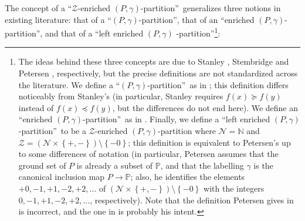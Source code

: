 \documentclass[numbers=enddot,12pt,final,onecolumn,notitlepage]{scrartcl}%
\theoremstyle{definition}
\begin{document}
The concept of a \textquotedblleft$\mathcal{Z}$-enriched $\left(
P,\gamma\right)  $-partition\textquotedblright\ generalizes three notions in
existing literature: that of a \textquotedblleft$\left(  P,\gamma\right)
$-partition\textquotedblright, that of an \textquotedblleft enriched $\left(
P,\gamma\right)  $-partition\textquotedblright, and that of a
\textquotedblleft left enriched $\left(  P,\gamma\right)  $%
-partition\textquotedblright\footnote{The ideas behind these three concepts
are due to Stanley \cite{Stanle72}, Stembridge \cite[\S 2]{Stembr97} and
Petersen \cite{Peters05}, respectively, but the precise definitions are not
standardized across the literature. We define a \textquotedblleft$\left(
P,\gamma\right)  $-partition\textquotedblright\ as in \cite[\S 1.1]{Stembr97};
this definition differs noticeably from Stanley's (in particular, Stanley
requires $f\left(  x\right)  \succcurlyeq f\left(  y\right)  $ instead of
$f\left(  x\right)  \preccurlyeq f\left(  y\right)  $, but the differences do
not end here). We define an \textquotedblleft enriched $\left(  P,\gamma
\right)  $-partition\textquotedblright\ as in \cite[\S 2]{Stembr97}. Finally,
we define a \textquotedblleft left enriched $\left(  P,\gamma\right)
$-partition\textquotedblright\ to be a $\mathcal{Z}$-enriched $\left(
P,\gamma\right)  $-partition where $\mathcal{N}=\mathbb{N}$ and $\mathcal{Z}%
=\left(  \mathcal{N}\times\left\{  +,-\right\}  \right)  \setminus\left\{
-0\right\}  $; this definition is equivalent to Petersen's
\cite[Definition 3.4.1]{Peters06} up to some differences of notation
(in particular, Petersen assumes that the ground set of $P$ is already
a subset of $\mathbb{P}$, and that the labelling $\gamma$ is the
canonical inclusion map $ P \to \mathbb{P}$; also, he identifies the elements
$+0, -1, +1, -2, +2, \ldots$ of
$\left(  \mathcal{N}\times\left\{  +,-\right\}  \right)  \setminus\left\{
-0\right\}  $ with the integers
$0, -1, +1, -2, +2, \ldots$, respectively).
Note that the definition Petersen gives in \cite[Definition 4.1]{Peters05}
is incorrect, and the one in \cite[Definition 3.4.1]{Peters06} is probably
his intent.}:
\end{document}
